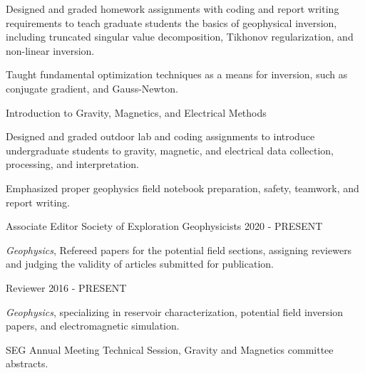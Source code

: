 \begin{cventries}
{\begin{cvparagraph}
      \vspace{7pt}
      \end{cvparagraph}
      \begin{cvitems} %
        \item {Designed and graded homework assignments with coding and report writing requirements to teach graduate students the basics of geophysical inversion, including truncated singular value decomposition, Tikhonov regularization, and non-linear inversion.}
        \item {Taught fundamental optimization techniques as a means for inversion, such as conjugate gradient, and Gauss-Newton.}
        \vspace{10pt}
      \end{cvitems}
      \begin{cvparagraph}
      \vspace{7pt}
      Introduction to Gravity, Magnetics, and Electrical Methods
      \vspace{7pt}
      \end{cvparagraph}
      \begin{cvitems} %
        \item {Designed and graded outdoor lab and coding assignments to introduce undergraduate students to gravity, magnetic, and electrical data collection, processing, and interpretation.}
        \item {Emphasized proper geophysics field notebook preparation, safety, teamwork, and report writing.}
      \end{cvitems}
    }

  \cventry
    {Associate Editor} %
    {Society of Exploration Geophysicists} %
    {} %
    {2020 - PRESENT} %
    {
      \begin{cvitems} %
        \item {{\it Geophysics}, Refereed papers for the potential field sections, assigning reviewers and judging the validity of articles submitted for publication.}
      \end{cvitems}
    }
    
  \cventry
    {Reviewer} %
    {} %
    {} %
    {2016 - PRESENT} %
    {
      \begin{cvitems} %
        \item {{\it Geophysics}, specializing in reservoir characterization, potential field inversion papers, and electromagnetic simulation.}
        \item {SEG Annual Meeting Technical Session, Gravity and Magnetics committee abstracts.}
      \end{cvitems}
    }

\end{cventries}
